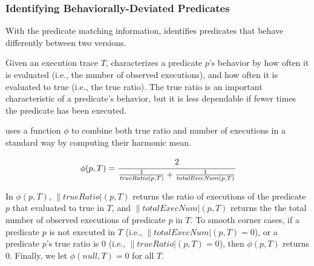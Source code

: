 %

\subsubsection{Identifying Behaviorally-Deviated Predicates}
\label{sec:identify_diff}

With the predicate matching information, \ourtool 
identifies predicates that behave differently
between two versions. 

Given an execution trace $\mathit{T}$,
\ourtool characterizes a predicate $\mathit{p}$'s behavior by how often
it is evaluated (i.e., the number of observed executions),
and how often it is evaluated to true (i.e., the true ratio).
The true ratio is an important characteristic of a predicate's behavior,
but it is less dependable
if fewer times the predicate has been executed.

\ourtool uses a function $\phi$ to combine both true ratio
and number of executions in a standard way by computing their harmonic mean.


\vspace{-2mm}

\begin{equation*}
 \|\phi|(p, T)= \cfrac{2}{\frac{1}{\|trueRatio|(p, T)} + \frac{1}{\|totalExecNum|(p, T)}}
\end{equation*}

\vspace{-1mm}

In $\phi(p, T)$, $\|trueRatio|(p, T)$ returns the ratio of executions of the
predicate $p$ that evaluated to true in $T$,
and $\|totalExecNum|(p, T)$ returns the the total
number of observed executions of predicate $p$ in $T$.
To smooth corner cases, if a predicate $p$ is not executed in $T$ 
(i.e., $\|totalExecNum|(p, T) = 0$), or
a predicate $p$'s true ratio is 0 (i.e., $\|trueRatio|(p, T) = 0$),
then $\phi(p, T)$ returns 0.
Finally, we let $\phi(null, T) = 0$ for all $T$.


